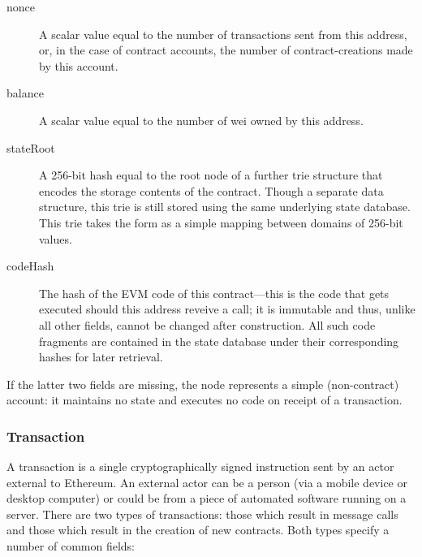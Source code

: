 \documentclass[9pt,oneside]{amsart}
\begin{document}
\begin{multicols}{2}
\begin{description}
\item[nonce] A scalar value equal to the number of transactions sent from this address, or, in the case of contract accounts, the number of contract-creations made by this account.
\item[balance] A scalar value equal to the number of wei owned by this address.
\item[stateRoot] A 256-bit hash equal to the root node of a further trie structure that encodes the storage contents of the contract. Though a separate data structure, this trie is still stored using the same underlying state database. This trie takes the form as a simple mapping between domains of 256-bit values.
\item[codeHash] The hash of the EVM code of this contract---this is the code that gets executed should this address reveive a call; it is immutable and thus, unlike all other fields, cannot be changed after construction. All such code fragments are contained in the state database under their corresponding hashes for later retrieval.
\end{description}

If the latter two fields are missing, the node represents a simple (non-contract) account: it maintains no state and executes no code on receipt of a transaction.

\subsubsection{Transaction} \label{ch:transaction}

A transaction is a single cryptographically signed instruction sent by an actor external to Ethereum. An external actor can be a person (via a mobile device or desktop computer) or could be from a piece of automated software running on a server. There are two types of transactions: those which result in message calls and those which result in the creation of new contracts. Both types specify a number of common fields:


\end{multicols}
\end{document}
